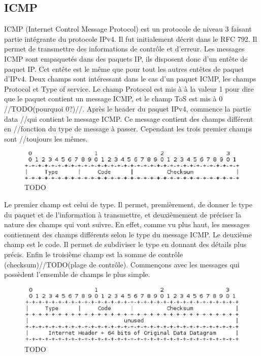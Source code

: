 \subsection{ICMP} ICMP (Internet Control Message Protocol) est un protocole de
niveau 3 faisant partie intégrante du protocole IPv4. Il fut initialement
décrit dans le RFC 792\cite{url-RFC-ICMP}.
Il permet de transmettre des informations de contrôle et d'erreur. Les messages
ICMP sont empaquetés dans des paquets IP, ils disposent donc d'un entête de
paquet IP. Cet entête est le même que pour tout les autres entêtes de paquet
d'IPv4. Deux champs sont intéressant dans le cas d'un paquet ICMP, les champs
Protocol et Type of service. Le champ Protocol est mis à à la valeur 1 pour
dire que le paquet contient un message ICMP, et le champ ToS est mis à 0
//TODO(pourquoi 0?)//.  Après le header du paquet IPv4, commence la partie data
//qui contient le message ICMP. Ce message contient des champs différent en
//fonction du type de message à passer. Cependant les trois premier champs sont
//toujours les mêmes.


\begin{figure}
\centering
\includegraphics[width=15cm]{./pics/header.eps}
\caption{TODO}
\label{fig:headicmp}
\end{figure}

Le premier champ est celui de type. Il permet, premièrement, de donner le type
du paquet et de l'information à transmettre, et deuxièmement de préciser la
nature des champs qui vont suivre. En effet, comme vu plus haut, les messages
contiennent des champs différents selon le type du message ICMP.
Le deuxième champ est le code. Il permet de subdiviser le type en donnant des détails plus
précis. Enfin le troisième champ est la somme de contrôle
(checksum)//TODO(plage de contrôle).  Commençons avec les messages qui
possèdent l'ensemble de champs le plus simple.

\begin{figure}
\centering
\includegraphics[width=15cm]{./pics/header1.eps}
\caption{TODO}
\label{fig:head1icmp}
\end{figure}

